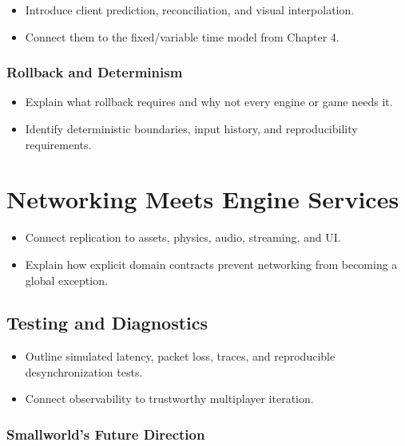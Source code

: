 \documentclass[
  11pt,
  letterpaper,
  DIV=11,
  numbers=noendperiod,
  twoside,
  open=right]{scrreprt}
\providecommand{\tightlist}{%
  \setlength{\itemsep}{0pt}\setlength{\parskip}{0pt}}
\begin{document}
\begin{itemize}
\tightlist
\item
  Introduce client prediction, reconciliation, and visual interpolation.
\item
  Connect them to the fixed/variable time model from Chapter 4.
\end{itemize}

\subsubsection{Rollback and Determinism}\label{rollback-and-determinism}

\begin{itemize}
\tightlist
\item
  Explain what rollback requires and why not every engine or game needs
  it.
\item
  Identify deterministic boundaries, input history, and reproducibility
  requirements.
\end{itemize}

\section{Networking Meets Engine
Services}\label{networking-meets-engine-services}

\begin{itemize}
\tightlist
\item
  Connect replication to assets, physics, audio, streaming, and UI.
\item
  Explain how explicit domain contracts prevent networking from becoming
  a global exception.
\end{itemize}

\subsection{Testing and Diagnostics}\label{testing-and-diagnostics}

\begin{itemize}
\tightlist
\item
  Outline simulated latency, packet loss, traces, and reproducible
  desynchronization tests.
\item
  Connect observability to trustworthy multiplayer iteration.
\end{itemize}

\subsubsection{Smallworld's Future
Direction}\label{smallworlds-future-direction}
\end{document}
